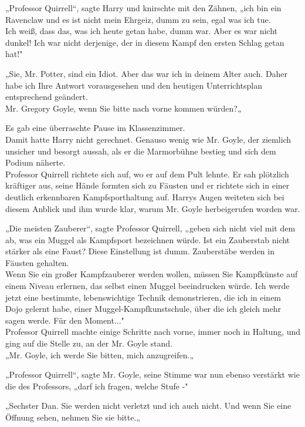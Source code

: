 {„Professor Quirrell“, sagte Harry und knirschte mit den Zähnen, „ich bin ein Ravenclaw und es ist nicht mein Ehrgeiz, dumm zu sein, egal was ich tue.\\ Ich weiß, dass das, was ich heute getan habe, dumm war. Aber es war nicht dunkel! Ich war nicht derjenige, der in diesem Kampf den ersten Schlag getan hat!"

„Sie, Mr. Potter, sind ein Idiot. Aber das war ich in deinem Alter auch. Daher habe ich Ihre Antwort vorausgesehen und den heutigen Unterrichtsplan entsprechend geändert.\\ Mr. Gregory Goyle, wenn Sie bitte nach vorne kommen würden?„

Es gab eine überraschte Pause im Klassenzimmer.\\ Damit hatte Harry nicht gerechnet. Genauso wenig wie Mr. Goyle, der ziemlich unsicher und besorgt aussah, als er die Marmorbühne bestieg und sich dem Podium näherte.\\ Professor Quirrell richtete sich auf, wo er auf dem Pult lehnte. Er sah plötzlich kräftiger aus, seine Hände formten sich zu Fäusten und er richtete sich in einer deutlich erkennbaren Kampfsporthaltung auf. Harrys Augen weiteten sich bei diesem Anblick und ihm wurde klar, warum Mr. Goyle herbeigerufen worden war.

„Die meisten Zauberer“, sagte Professor Quirrell, „geben sich nicht viel mit dem ab, was ein Muggel als Kampfsport bezeichnen würde. Ist ein Zauberstab nicht stärker als eine Faust? Diese Einstellung ist dumm. Zauberstäbe werden in Fäusten gehalten.\\ Wenn Sie ein großer Kampfzauberer werden wollen, müssen Sie Kampfkünste auf einem Niveau erlernen, das selbst einen Muggel beeindrucken würde. Ich werde jetzt eine bestimmte, lebenswichtige Technik demonstrieren, die ich in einem Dojo gelernt habe, einer Muggel-Kampfkunstschule, über die ich gleich mehr sagen werde. Für den Moment..."\\ Professor Quirrell machte einige Schritte nach vorne, immer noch in Haltung, und ging auf die Stelle zu, an der Mr. Goyle stand.\\ „Mr. Goyle, ich werde Sie bitten, mich anzugreifen.„

„Professor Quirrell“, sagte Mr. Goyle, seine Stimme war nun ebenso verstärkt wie die des Professors, „darf ich fragen, welche Stufe -"

„Sechster Dan. Sie werden nicht verletzt und ich auch nicht. Und wenn Sie eine Öffnung sehen, nehmen Sie sie bitte.„

}
